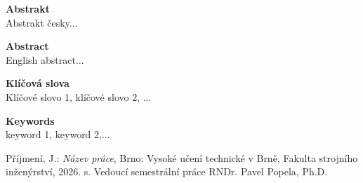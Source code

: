 \documentclass[../bakalarka-main.tex]{subfiles}
\begin{document}
	\newpage
	\thispagestyle{empty}
	\noindent
	{\bf Abstrakt}\\[1mm]
	Abstrakt česky...
	
	\vspace{1cm}\noindent
	{\bf Abstract}\\[1mm]
	English abstract...
	
	\vspace{1cm}
	\noindent
	{\bf Klíčová slova}\\
	Klíčové slovo 1, klíčové slovo 2, ...
	
	\vspace{1cm}
	\noindent
	{\bf Keywords}\\
	keyword 1, keyword 2,...
	
	\vfill\noindent
	Příjmení, J.: {\it Název práce}, Brno: Vysoké učení technické v Brně, Fakulta strojního inženýrství, 2026. \pageref{LastPage} s. Vedoucí semestrální práce RNDr. Pavel Popela, Ph.D.
	
	\newpage
	\thispagestyle{empty}
	\
\end{document}
